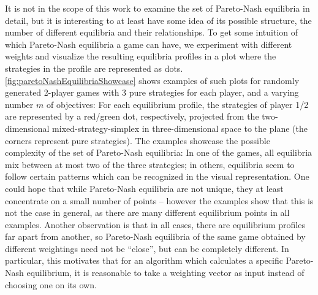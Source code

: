 \documentclass[a4paper,DIV=11,abstracton,twoside=semi]{scrreprt}
\theoremstyle{definition}
\begin{document}
    It is not in the scope of this work to examine the set of Pareto-Nash equilibria in detail, but it is interesting to at least have some idea of its possible structure, 
    the number of different equilibria and their relationships.
    To get some intuition of which Pareto-Nash equilibria a game can have, we experiment with different weights and visualize the resulting equilibria profiles in a plot where the strategies in the profile are represented as dots.
    \autoref{fig:paretoNashEquilibriaShowcase}
    shows examples of such plots for randomly generated 2-player games with 3 pure strategies for each player, and a varying number $m$ of objectives: For each equilibrium profile, the strategies of player 1/2 are represented by a red/green dot, respectively, projected from the two-dimensional mixed-strategy-simplex in three-dimensional space to the plane 
    (the corners represent pure strategies).
    The examples showcase the possible complexity of the set of Pareto-Nash equilibria:
    In one of the games, all equilibria mix between at most two of the three strategies; in others, equilibria seem to follow certain patterns which can be recognized in the visual representation.
    One could hope that while Pareto-Nash equilibria are not unique, they at least concentrate on a small number of points -- however the examples show that this is not the case in general, as there are many different equilibrium points in all examples.
    Another observation is that in all cases, there are equilibrium profiles far apart from another, so Pareto-Nash equilibria of the same game obtained by different weightings need not be “close”, but can be completely different.
    In particular, this motivates that for an algorithm which calculates a specific Pareto-Nash equilibrium, it is reasonable to take a weighting vector as input instead of choosing one on its own.
\end{document}
